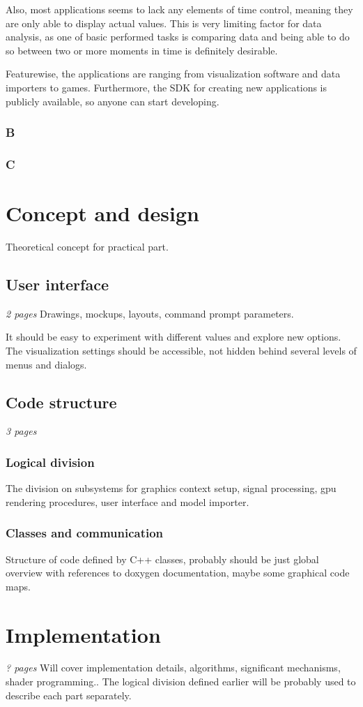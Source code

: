 Also, most applications seems to lack any elements of time control, meaning
they are only able to display actual values. This is very limiting factor for
data analysis, as one of basic performed tasks is comparing data and being
able to do so between two or more moments in time is definitely desirable.

Featurewise, the applications are ranging from visualization software and
data importers to games. Furthermore, the SDK for creating new applications is
publicly available, so anyone can start developing.
\subsection{B}
\subsection{C}
\chapter{Concept and design}
Theoretical concept for practical part.
\section{User interface}
\emph{2 pages}
Drawings, mockups, layouts, command prompt parameters.

It should be easy to experiment with different values and explore new options.
The visualization settings should be accessible, not hidden behind several
levels of menus and dialogs.
\section{Code structure}
\emph{3 pages}
\subsection{Logical division}
The division on subsystems for graphics context setup, signal processing, gpu
rendering procedures, user interface and model importer.
\subsection{Classes and communication}
Structure of code defined by C++ classes, probably should be just global
overview with references to doxygen documentation, maybe some graphical code
maps.
\chapter{Implementation}
\emph{? pages}
Will cover implementation details, algorithms, significant mechanisms, shader
programming.. The logical division defined earlier will be probably used to
describe each part separately.
